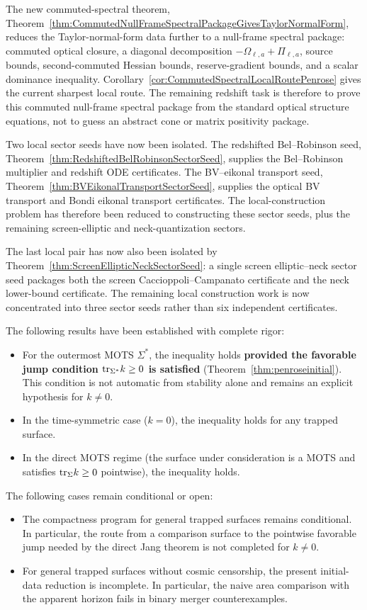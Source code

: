 The new commuted-spectral theorem, Theorem~\ref{thm:CommutedNullFrameSpectralPackageGivesTaylorNormalForm}, reduces the Taylor-normal-form data further to a null-frame spectral package: commuted optical closure, a diagonal decomposition $-\Omega_{\ell,a}+\Pi_{\ell,a}$, source bounds, second-commuted Hessian bounds, reserve-gradient bounds, and a scalar dominance inequality. Corollary~\ref{cor:CommutedSpectralLocalRoutePenrose} gives the current sharpest local route. The remaining redshift task is therefore to prove this commuted null-frame spectral package from the standard optical structure equations, not to guess an abstract cone or matrix positivity package.

Two local sector seeds have now been isolated. The redshifted Bel--Robinson seed, Theorem~\ref{thm:RedshiftedBelRobinsonSectorSeed}, supplies the Bel--Robinson multiplier and redshift ODE certificates. The BV--eikonal transport seed, Theorem~\ref{thm:BVEikonalTransportSectorSeed}, supplies the optical BV transport and Bondi eikonal transport certificates. The local-construction problem has therefore been reduced to constructing these sector seeds, plus the remaining screen-elliptic and neck-quantization sectors.

The last local pair has now also been isolated by Theorem~\ref{thm:ScreenEllipticNeckSectorSeed}: a single screen elliptic--neck sector seed packages both the screen Caccioppoli--Campanato certificate and the neck lower-bound certificate. The remaining local construction work is now concentrated into three sector seeds rather than six independent certificates.

The following results have been established with complete rigor:
\begin{itemize}
    \item For the outermost MOTS $\Sigma^*$, the inequality holds \textbf{provided the favorable jump condition $\mathrm{tr}_{\Sigma^*} k \ge 0$ is satisfied} (Theorem~\ref{thm:penroseinitial}). This condition is not automatic from stability alone and remains an explicit hypothesis for $k \neq 0$.
    \item In the time-symmetric case ($k=0$), the inequality holds for any trapped surface.
    \item In the direct MOTS regime (the surface under consideration is a MOTS and satisfies $\mathrm{tr}_\Sigma k \geq 0$ pointwise), the inequality holds.
\end{itemize}

The following cases remain conditional or open:
\begin{itemize}
    \item The compactness program for general trapped surfaces remains conditional. In particular, the route from a comparison surface to the pointwise favorable jump needed by the direct Jang theorem is not completed for $k \neq 0$.
    \item For general trapped surfaces without cosmic censorship, the present initial-data reduction is incomplete. In particular, the naive area comparison with the apparent horizon fails in binary merger counterexamples.
\end{itemize}

